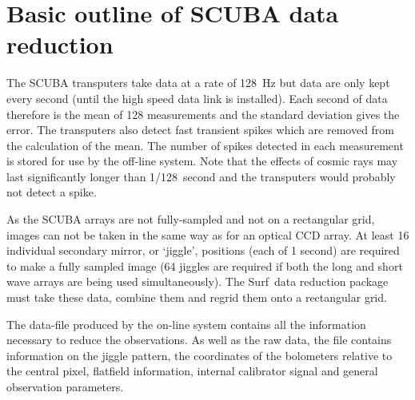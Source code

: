 \documentclass[twoside,11pt]{article}
\newcommand{\scusoft}          {{\sc Surf}}
\newcommand{\xlabel}[1]{}
\begin{document}
\section{\xlabel{outline}Basic outline of SCUBA data reduction\label{outline}}

The SCUBA transputers take data at a rate of 128~Hz but data are only kept
every second (until the high speed data link is installed). Each second of
data therefore is the mean of 128 measurements and the standard deviation
gives the error. The transputers also detect fast transient spikes which are
removed from the calculation of the mean. The number of spikes detected in
each measurement is stored for use by the off-line system. Note that the
effects of cosmic rays may last significantly longer than 1/128~second and the
transputers would probably not detect a spike.

As the SCUBA arrays are not fully-sampled and not on a rectangular grid, images
can not be taken in the same way as for an optical CCD array. At least 16
individual secondary mirror, or `jiggle', positions (each of 1 second) are
required to make a fully sampled image (64 jiggles are required if both the
long and short wave arrays are being used simultaneously). The \scusoft\ data
reduction package must take these data, combine them and regrid them onto a
rectangular grid.

The data-file produced by the on-line system contains all the information
necessary to reduce the observations. As well as the raw data, the file
contains information on the jiggle pattern, the coordinates of the
bolometers relative to the central pixel, flatfield information, internal
calibrator signal and general observation parameters.
\end{document}
